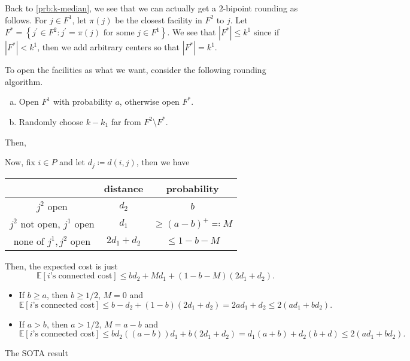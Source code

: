 Back to \autoref{prb:k-median}, we see that we can actually get a \(2\)-bipoint rounding as follows. For \(j\in F^1\), let \(\pi (j)\) be the closest facility in \(F^2\) to \(j\). Let \(F^{\ast} = \left\{ j^\prime \in F^2 \colon j^\prime =\pi (j) \text{ for some }j\in F^1  \right\} \). We see that \(\left\vert F^{\ast}  \right\vert \leq k^1\) since if \(\left\vert F^{\ast}  \right\vert < k^1\), then we add arbitrary centers so that \(\left\vert F^{\ast}  \right\vert = k^1\).

To open the facilities as what we want, consider the following rounding algorithm.
\begin{enumerate}[(a)]
	\item Open \(F^1\) with probability \(a\), otherwise open \(F^{\ast} \).
	\item Randomly choose \(k - k_1\) far from \(F^2 \setminus F^{\ast} \).
\end{enumerate}

Then,

Now, fix \(i\in P\) and let \(d_j \coloneqq d(i, j)\), then we have
\begin{table}[H]
	\centering
	\begin{tabular}{c|c|c}
		\toprule
		                               & distance       & probability                  \\
		\midrule
		\(j^2\) open                   & \(d_2\)        & \(b\)                        \\
		\(j^2\) not open, \(j^1\) open & \(d_1\)        & \(\geq (a-b)^+ \eqqcolon M\) \\
		none of \(j^1, j^2\) open      & \(2d_1 + d_2\) & \(\leq 1 - b - M\)           \\
		\bottomrule
	\end{tabular}
\end{table}

Then, the expected cost is just
\[
	\mathbb{E}\left[\text{\(i\)'s connected cost}\right] \leq b d_2 + Md_1 + (1 - b - M) (2d_1 + d_2).
\]

\begin{itemize}
	\item If \(b \geq a\), then \(b \geq 1 / 2\), \(M = 0\) and
	      \[
		      \mathbb{E}\left[\text{\(i\)'s connected cost}\right] \leq b - d_2 + (1 - b)	(2 d_1 + d_2) = 2ad_1 + d_2 \leq 2(ad_1 + bd_2).
	      \]
	\item If \(a > b\), then \(a > 1 / 2\), \(M = a - b\) and
	      \[
		      \mathbb{E}\left[\text{\(i\)'s connected cost}\right] \leq bd_2 ( (a - b))d_1 + b(2d_1 + d_2) = d_1(a+b)+d_2(b+d) \leq 2(ad_1 + bd_2).
	      \]
\end{itemize}

\begin{remark}[SOTA]
	The SOTA result
\end{remark}